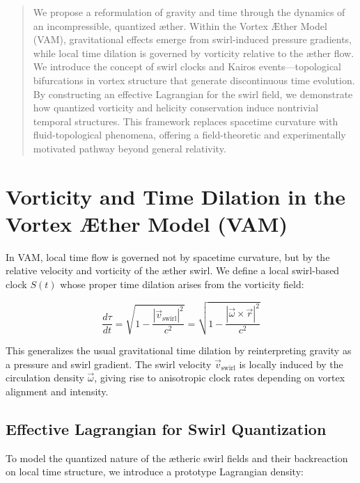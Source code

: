 \documentclass[12pt]{article}
\begin{document}
    \titlepageOpen

    \begin{abstract}

We propose a reformulation of gravity and time through the dynamics of an incompressible, quantized æther. Within the Vortex Æther Model (VAM), gravitational effects emerge from swirl-induced pressure gradients, while local time dilation is governed by vorticity relative to the æther flow. We introduce the concept of swirl clocks and Kairos events—topological bifurcations in vortex structure that generate discontinuous time evolution. By constructing an effective Lagrangian for the swirl field, we demonstrate how quantized vorticity and helicity conservation induce nontrivial temporal structures. This framework replaces spacetime curvature with fluid-topological phenomena, offering a field-theoretic and experimentally motivated pathway beyond general relativity.

    \end{abstract}



    \titlepageClose
    \fi

    \section{Vorticity and Time Dilation in the Vortex Æther Model (VAM)}


In VAM, local time flow is governed not by spacetime curvature, but by the relative velocity and vorticity of the æther swirl. We define a local swirl-based clock \( S(t) \) whose proper time dilation arises from the vorticity field:

\[
    \frac{d\tau}{dt} = \sqrt{1 - \frac{|\vec{v}_{\text{swirl}}|^2}{c^2}} = \sqrt{1 - \frac{|\vec{\omega} \times \vec{r}|^2}{c^2}}
\]

This generalizes the usual gravitational time dilation by reinterpreting gravity as a pressure and swirl gradient. The swirl velocity \( \vec{v}_{\text{swirl}} \) is locally induced by the circulation density \( \vec{\omega} \), giving rise to anisotropic clock rates depending on vortex alignment and intensity.

\subsection{Effective Lagrangian for Swirl Quantization}

To model the quantized nature of the ætheric swirl fields and their backreaction on local time structure, we introduce a prototype Lagrangian density:
\end{document}
